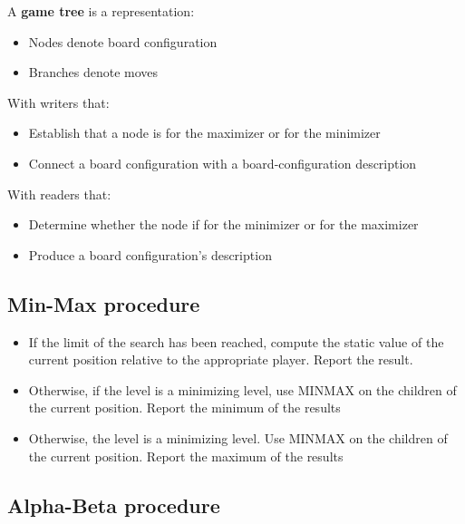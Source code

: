 \documentclass{article}
\begin{document}
A \textbf{game tree} is a representation:
\begin{itemize}
  \item Nodes denote board configuration
  \item Branches denote moves
\end{itemize}
With writers that:
\begin{itemize}
  \item Establish that a node is for the maximizer or for
    the minimizer
  \item Connect a board configuration with a board-configuration
    description
\end{itemize}
With readers that:
\begin{itemize}
  \item Determine whether the node if for the minimizer
    or for the maximizer
  \item Produce a board configuration's description
\end{itemize}

\subsection{Min-Max procedure}

\begin{itemize}
  \item If the limit of the search has been reached, compute 
    the static value of the current position relative to the
    appropriate player. Report the result.
  \item Otherwise, if the level is a minimizing level, use
    MINMAX on the children of the current position. Report 
    the minimum of the results
  \item Otherwise, the level is a minimizing level. Use
    MINMAX on the children of the current position. Report 
    the maximum of the results
\end{itemize}

\subsection{Alpha-Beta procedure}
\end{document}
